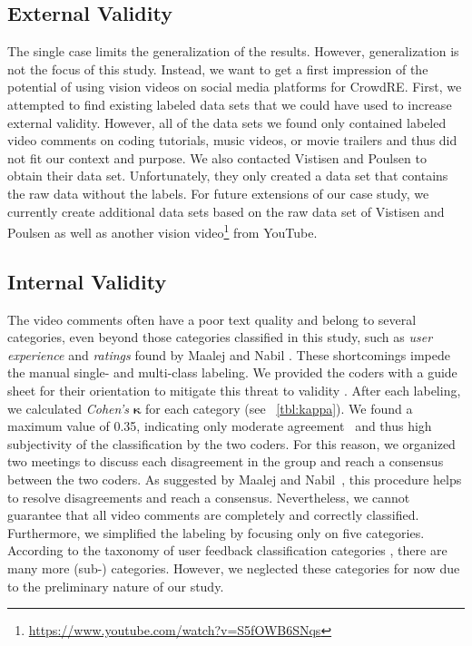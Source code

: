 \documentclass[conference]{IEEEtran}
\begin{document}
{\subsection{External Validity}
The single case limits the generalization of the results. However, generalization is not the focus of this study. Instead, we want to get a first impression of the potential of using vision videos on social media platforms for CrowdRE. First, we attempted to find existing labeled data sets that we could have used to increase external validity. However, all of the data sets we found only contained labeled video comments on coding tutorials, music videos, or movie trailers and thus did not fit our context and purpose. We also contacted Vistisen and Poulsen \cite{Vistisen.2017} to obtain their data set. Unfortunately, they only created a data set that contains the raw data without the labels. For future extensions of our case study, we currently create additional data sets based on the raw data set of Vistisen and Poulsen \cite{Vistisen.2017} as well as another vision video\footnote{\url{https://www.youtube.com/watch?v=S5fOWB6SNqs}} from YouTube.

\subsection{Internal Validity}
The video comments often have a poor text quality and belong to several categories, even beyond those categories classified in this study, such as \textit{user experience} and \textit{ratings} found by Maalej and Nabil \cite{Maalej.2015}. These shortcomings impede the manual single- and multi-class labeling. We provided the coders with a guide sheet for their orientation to mitigate this threat to validity \cite{Neuendorf.2015}. After each labeling, we calculated \textit{Cohen's} $\bm{\kappa}$ \cite{Cohen.1960} for each category (see \tablename{~\ref{tbl:kappa}}). We found a maximum value of 0.35, indicating only moderate agreement~\cite{Landis.1977} and thus high subjectivity of the classification by the two coders. For this reason, we organized two meetings to discuss each disagreement in the group and reach a consensus between the two coders. As suggested by Maalej and Nabil~\cite{Maalej.2015}, this procedure helps to resolve disagreements and reach a consensus. Nevertheless, we cannot guarantee that all video comments are completely and correctly classified. Furthermore, we simplified the labeling by focusing only on five categories. According to the taxonomy of user feedback classification categories \cite{Santos.2019}, there are many more (sub-) categories. However, we neglected these categories for now due to the preliminary nature of our study.

}
\end{document}
